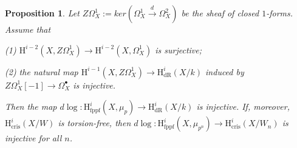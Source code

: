 \documentclass[a4paper,12pt,twoside]{report}
\newtheorem{proposition}[theorem]{Proposition}
\newcommand{\cris}{\mathrm{cris}}
\newcommand{\fppf}{\mathrm{fppf}}
\newcommand{\dR}{\mathrm{dR}}
\newcommand{\HH}{\mathrm{H}}
\begin{document}
\begin{proposition} \label{Injarg}
    Let $Z\Omega^1_X:=ker(\Omega_X^1\xrightarrow[]{d} \Omega^2_X)$ be the sheaf of closed $1$-forms. Assume that 
    
{\rm  (1)} $\HH^{i-2}(X,Z\Omega_X^1)\rightarrow \HH^{i-2}(X,\Omega_X^1)$ is surjective;

{\rm  (2)} the natural map $\HH^{i-1}(X,Z\Omega^1_X) \rightarrow \HH^i_{\dR}(X/k)$ 
    induced by $Z\Omega^1_X[-1] \rightarrow \Omega_X^\bullet$ is injective.

\noindent Then the map $d\log: \HH^i_{\fppf}(X,\mu_{p}) \rightarrow \HH^i_{\dR}(X/k)$ is injective. 
    If, moreover, $\HH^i_{\cris}(X/W)$ is torsion-free, 
    then $d\log: \HH^i_{\fppf}(X,\mu_{p^n}) \rightarrow \HH^i_{\cris}(X/W_n)$ is injective for all $n$. 
\end{proposition}
\end{document}
